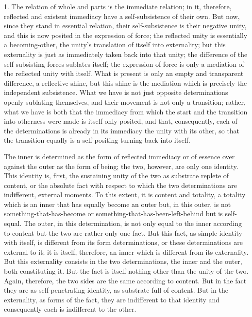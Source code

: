 1. The relation of whole and parts is the immediate relation;
in it, therefore, reflected and existent immediacy have
a self-subsistence of their own.
But now, since they stand in essential relation,
their self-subsistence is their negative unity,
and this is now posited in the expression of force;
the reflected unity is essentially a becoming-other,
the unity's translation of itself into externality;
but this externality is just as immediately
taken back into that unity;
the difference of the self-subsisting forces sublates itself;
the expression of force is only a mediation
of the reflected unity with itself.
What is present is only an empty
and transparent difference, a reflective shine,
but this shine is the mediation
which is precisely the independent subsistence.
What we have is not just opposite determinations
openly sublating themselves,
and their movement is not only a transition;
rather, what we have is both that
the immediacy from which the start
and the transition into otherness
were made is itself only posited,
and that, consequently, each of the determinations is
already in its immediacy the unity with its other,
so that the transition equally is
a self-positing turning back into itself.

The inner is determined as
the form of reflected immediacy
or of essence over against
the outer as the form of being;
the two, however, are only one identity.
This identity is, first,
the sustaining unity of the two
as substrate replete of content,
or the absolute fact with respect to which
the two determinations are indifferent, external moments.
To this extent, it is content and totality,
a totality which is an inner
that has equally become an outer
but, in this outer, is not something-that-has-become
or something-that-has-been-left-behind but is self-equal.
The outer, in this determination, is not only
equal to the inner according to content
but the two are rather only one fact.
But this fact, as simple identity with itself,
is different from its form determinations,
or these determinations are external to it;
it is itself, therefore, an inner
which is different from its externality.
But this externality consists in the two determinations,
the inner and the outer, both constituting it.
But the fact is itself nothing other
than the unity of the two.
Again, therefore, the two sides are
the same according to content.
But in the fact they are as self-penetrating identity,
as substrate full of content.
But in the externality, as forms of the fact,
they are indifferent to that identity
and consequently each is indifferent to the other.

